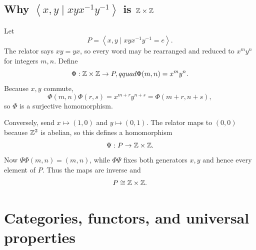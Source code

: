 \documentclass[11pt,openany]{book}
\newcommand{\angles}[1]{\left\langle#1\right\rangle}
\theoremstyle{definition}
\begin{document}
\section{Why $\angles{x,y\mid xyx^{-1}y^{-1}}$ is $\mathbb Z\times\mathbb Z$}
Let
\[
P=\angles{x,y\mid xyx^{-1}y^{-1}=e}.
\]
The relator says $xy=yx$, so every word may be rearranged and reduced to $x^my^n$ for integers $m,n$. Define
\[
\Phi:\mathbb Z\times\mathbb Z\to P,qquad \Phi(m,n)=x^my^n.
\]
Because $x,y$ commute,
\[
\Phi(m,n)\Phi(r,s)=x^{m+r}y^{n+s}=\Phi(m+r,n+s),
\]
so $\Phi$ is a surjective homomorphism.

Conversely, send $x\mapsto(1,0)$ and $y\mapsto(0,1)$. The relator maps to $(0,0)$ because $\mathbb Z^2$ is abelian, so this defines a homomorphism
\[
\Psi:P\to\mathbb Z\times\mathbb Z.
\]
Now $\Psi\Phi(m,n)=(m,n)$, while $\Phi\Psi$ fixes both generators $x,y$ and hence every element of $P$. Thus the maps are inverse and
\[
P\cong\mathbb Z\times\mathbb Z.
\]


\chapter{Categories, functors, and universal properties}
\end{document}
